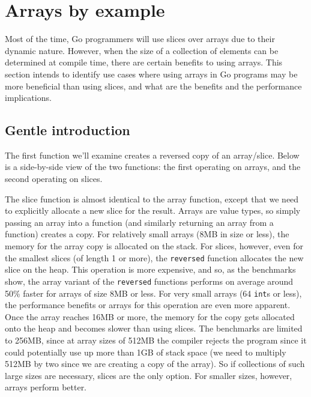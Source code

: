 \section{Arrays by example}

Most of the time, Go programmers will use slices over arrays due to their
dynamic nature. However, when the size of a collection of elements can be
determined at compile time, there are certain benefits to using arrays. This
section intends to identify use cases where using arrays in Go programs may be
more beneficial than using slices, and what are the benefits and the performance
implications.

\subsection{Gentle introduction}

The first function we'll examine creates a reversed copy of an array/slice.
Below is a side-by-side view of the two functions: the first operating on
arrays, and the second operating on slices.


The slice function is almost identical to the array function, except that we
need to explicitly allocate a new slice for the result. Arrays are value types,
so simply passing an array into a function (and similarly returning an array
from a function) creates a copy. For relatively small arrays (8MB in size or
less), the memory for the array copy is allocated on the stack. For slices,
however, even for the smallest slices (of length 1 or more), the
\texttt{reversed} function allocates the new slice on the heap. This operation
is more expensive, and so, as the benchmarks show, the array variant of the
\texttt{reversed} functions performs on average around 50\% faster for arrays of
size 8MB or less. For very small arrays (64 \texttt{int}s or less), the
performance benefits or arrays for this operation are even more apparent. Once
the array reaches 16MB or more, the memory for the copy gets allocated onto the
heap and becomes slower than using slices. The benchmarks are limited to 256MB,
since at array sizes of 512MB the compiler rejects the program since it could
potentially use up more than 1GB of stack space (we need to multiply 512MB by
two since we are creating a copy of the array). So if collections of such large
sizes are necessary, slices are the only option. For smaller sizes, however,
arrays perform better.


